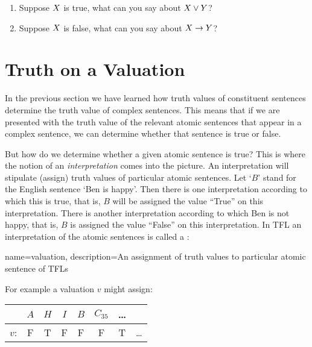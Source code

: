 \begin{practiceproblems}
	
	
	\problempart 
\begin{enumerate}
	\item Suppose $X$ is true, what can you say about $X\vee Y$?
\item Suppose $X$ is false, what can you say about $X\rightarrow Y$?
\end{enumerate}

\end{practiceproblems}

\chapter{Truth on a Valuation}
In the previous section we have learned how truth values of constituent sentences determine the truth value of complex sentences. This means that if we are presented with the truth value of the relevant atomic sentences that appear in a complex sentence, we can determine whether that sentence is true or false.

But how do we determine whether a given atomic sentence is true? This is where the notion of an \emph{interpretation} comes into the picture. An interpretation will stipulate (assign) truth values of particular atomic sentences. Let `$B$' stand for the English sentence `Ben is happy'. Then there is one interpretation according to which this is true, that is, $B$ will be assigned the value ``True'' on this interpretation. There is another interpretation according to which Ben is not happy, that is, $B$ is assigned the value ``False'' on this interpretation. In TFL an interpretation of the atomic sentences is called a :


{
name=valuation,
description={An assignment of \glspl{truth value} to particular atomic \glspl{sentence of TFL}}
}


For example a valuation $v$ might assign:
\begin{center}
	\begin{tabular}{rccccccc}
	&	$A$&$H$&$I$&$B$&$C_{35}$&\ldots\\\hline
	$v$:&	F & T &F&F&F&T&\ldots
	\end{tabular}
\end{center}

